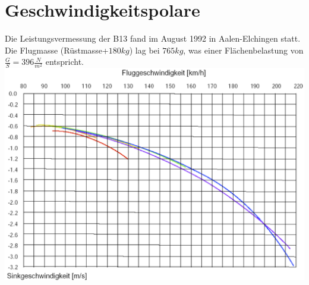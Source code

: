 \section{Geschwindigkeitspolare}
Die Leistungsvermessung der B13 fand im August 1992 in Aalen-Elchingen statt. Die Flugmasse (Rüstmasse+$180kg$) lag bei $765 kg$, was einer Flächenbelastung von $\frac{G}{S}=396 \frac{N}{m^2}$ entspricht. \\
\newline
\includegraphics[width=\textwidth]{polare.png}
\newline
